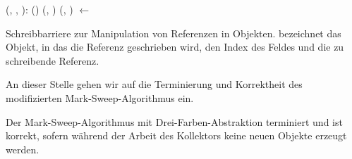 \begin{algorithm}[h]
\begin{algorithmic}[1]
	\State \Atomic {}(, , ):
	\State \quad \IF {}()
	\State \quad \quad {}(, )
	\State \quad \quad {}(, )
	\State \quad {} $\gets$ 
\end{algorithmic}
\caption[Schreibbarriere zur Manipulation von Referenzen]{Schreibbarriere zur Manipulation von Referenzen in Objekten.  bezeichnet das Objekt, in das die Referenz geschrieben wird,  den Index des Feldes und  die zu schreibende Referenz.}
\label{algo:tricolor-barrier}
\end{algorithm}

An dieser Stelle gehen wir auf die Terminierung und Korrektheit des modifizierten Mark-Sweep-Algorithmus ein.

\begin{mybox}
\begin{satz}
	\label{satz:tricolor-correctness}
	Der Mark-Sweep-Algorithmus mit Drei-Farben-Abstraktion terminiert und ist korrekt, sofern während der Arbeit des Kollektors keine neuen Objekte erzeugt werden.
\end{satz}
\end{mybox}

